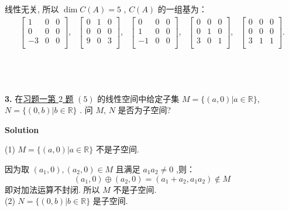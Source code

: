 \documentclass[11pt,a4paper,openany,oneside]{book}
\newcommand\Solution{\noindent\textbf{\textsf{Solution}}\par\medskip}
\begin{document}
线性无关, 所以 $ \dim C(A)= 5 $ ,  $ C(A) $ 的一组基为：
\begin{gather*}
\begin{bmatrix}
1 &  0  &  0  \\
0 &  0  &  0  \\
-3 &  0  &  0  \\
\end{bmatrix},
\ \ \ 
\begin{bmatrix}
0 &  1  &  0  \\
0 &  0  &  0  \\
9 &  0  &  3  \\
\end{bmatrix},
\ \ \ 
\begin{bmatrix}
0 &  0  &  0  \\
1 &  0  &  0  \\
-1&  0  &  0  \\
\end{bmatrix},
\ \ \ 
\begin{bmatrix}
0 &  0  &  0  \\
0 &  1  &  0  \\
3 &  0  &  1  \\
\end{bmatrix},
\ \ \ 
\begin{bmatrix}
0 &  0  &  0  \\
0 &  0  &  0  \\
3 &  1  &  1  \\
\end{bmatrix}.
\end{gather*} \\  \\  \\  



\begin{myexample}
	\textbf{3.} 在\hyperlink{4.1.2}{习题一第 $ 2 $ 题} $ (5) $ 的线性空间中给定子集 $ M = \{(a, 0) | a \in \mathbb{R} \}$, $ N = \{(0, b)| b \in \mathbb{R} \} $ . 问 $ M $, $ N $ 是否为子空间?
\end{myexample}
\Solution

(1)  $ M = \{(a, 0) | a \in \mathbb{R} \} $  不是子空间. 

因为取 $  (a_1, 0), (a_2, 0) \in M  $  且满足 $ a_1a_2 \neq 0 $ ,则：
 $$  (a_1, 0) \oplus  (a_2, 0) = (a_1 + a_2, a_1a_2) \notin  M  $$ 
即对加法运算不封闭. 所以 $ M $ 不是子空间. \\

(2)  $ N = \{(0, b)| b \in \mathbb{R} \} $ 是子空间.
\end{document}
